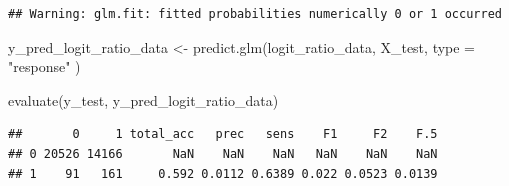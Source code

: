 \documentclass[a4paper, nobind]{templates/ociamthesis}
\newenvironment{Shaded}{\begin{snugshade}}{\end{snugshade}}
\newcommand{\AttributeTok}[1]{\textcolor[rgb]{0.77,0.63,0.00}{#1}}
\newcommand{\DocumentationTok}[1]{\textcolor[rgb]{0.56,0.35,0.01}{\textbf{\textit{#1}}}}
\newcommand{\FloatTok}[1]{\textcolor[rgb]{0.00,0.00,0.81}{#1}}
\newcommand{\FunctionTok}[1]{\textcolor[rgb]{0.00,0.00,0.00}{#1}}
\newcommand{\NormalTok}[1]{#1}
\newcommand{\OtherTok}[1]{\textcolor[rgb]{0.56,0.35,0.01}{#1}}
\newcommand{\SpecialCharTok}[1]{\textcolor[rgb]{0.00,0.00,0.00}{#1}}
\newcommand{\StringTok}[1]{\textcolor[rgb]{0.31,0.60,0.02}{#1}}
\renewenvironment{Shaded}
{
  \vspace{10pt}%
  \begin{snugshade}%
}{%
  \end{snugshade}%
  \vspace{8pt}%
}
\begin{document}
\begin{Shaded}
\end{Shaded}

\begin{verbatim}
## Warning: glm.fit: fitted probabilities numerically 0 or 1 occurred
\end{verbatim}

\begin{Shaded}
\begin{Highlighting}[]
\NormalTok{y\_pred\_logit\_ratio\_data }\OtherTok{\textless{}{-}} \FunctionTok{predict.glm}\NormalTok{(logit\_ratio\_data, X\_test,}
                                       \AttributeTok{type =} \StringTok{"response"}\NormalTok{ )}

\FunctionTok{evaluate}\NormalTok{(y\_test, y\_pred\_logit\_ratio\_data)}
\end{Highlighting}
\end{Shaded}

\begin{verbatim}
##       0     1 total_acc   prec   sens    F1     F2    F.5
## 0 20526 14166       NaN    NaN    NaN   NaN    NaN    NaN
## 1    91   161     0.592 0.0112 0.6389 0.022 0.0523 0.0139
\end{verbatim}
\end{document}
